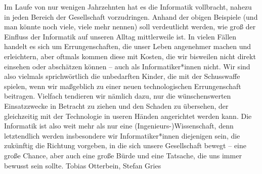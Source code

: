 {    Im Laufe von nur wenigen Jahrzehnten hat es die Informatik vollbracht, nahezu in jeden Bereich der Gesellschaft vorzudringen. Anhand der obigen Beispiele (und man könnte noch viele, viele mehr nennen) soll verdeutlicht werden, wie groß der Einfluss der Informatik auf unseren Alltag mittlerweile ist. In vielen Fällen handelt es sich um Errungenschaften, die unser Leben angenehmer machen und erleichtern, aber oftmals kommen diese mit Kosten, die wir bisweilen nicht direkt einsehen oder abschätzen können -- auch als Informatiker*innen nicht. Wir sind also vielmals sprichwörtlich die unbedarften Kinder, die mit der Schusswaffe spielen, wenn wir maßgeblich zu einer neuen technologischen Errungenschaft beitragen. Vielfach tendieren wir nämlich dazu, nur die wünschenswerten Einsatzzwecke in Betracht zu ziehen und den Schaden zu übersehen, der gleichzeitig mit der Technologie in useren Händen angerichtet werden kann. Die Informatik ist also weit mehr als nur eine (Ingenieurs-)Wissenschaft, denn letztendlich werden insbesondere wir Informatiker*innen diejenigen sein, die zukünftig die Richtung vorgeben, in die sich unsere Gesellschaft bewegt -- eine große Chance, aber auch eine große Bürde und eine Tatsache, die uns immer bewusst sein sollte.}
{Tobias Otterbein, Stefan Gries}
\newpage
